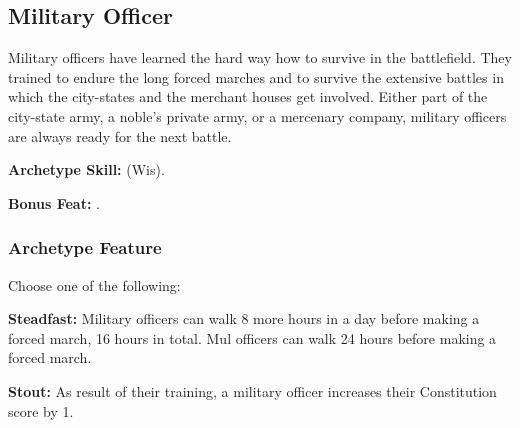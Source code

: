 \subsection{Military Officer}
Military officers have learned the hard way how to survive in the battlefield. They trained to endure the long forced marches and to survive the extensive battles in which the city-states and the merchant houses get involved. Either part of the city-state army, a noble's private army, or a mercenary company, military officers are always ready for the next battle.

\textbf{Archetype Skill:}  (Wis).

\textbf{Bonus Feat:} .

\subsubsection{Archetype Feature}
Choose one of the following:

\textbf{Steadfast:} Military officers can walk 8 more hours in a day before making a forced march, 16 hours in total. Mul officers can walk 24 hours before making a forced march.

\textbf{Stout:} As result of their training, a military officer increases their Constitution score by 1.


